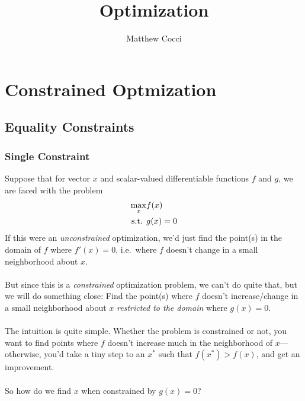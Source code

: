 \documentclass[a4paper,12pt]{scrartcl}
\author{Matthew Cocci}
\title{Optimization}
\date{}
\theoremstyle{definition}
\theoremstyle{remark}
\begin{document}
\maketitle

\tableofcontents %

\clearpage
\section{Constrained Optmization}

\subsection{Equality Constraints}

\subsubsection{Single Constraint}
Suppose that for vector $x$ and scalar-valued differentiable functions
$f$ and $g$, we are faced with the problem
\begin{align}
  \max_x &f(x) \label{prob:eqconst}\\
  \text{s.t. } &g(x) = 0 \notag
\end{align}
If this were an \emph{unconstrained} optimization, we'd just find the
point(s) in the domain of $f$ where $f'(x)=0$, i.e.\ where $f$ doesn't
change in a small neighborhood about $x$.
\\
\\
But since this is a \emph{constrained} optimization problem, we can't do
quite that, but we will do something close: Find the point(s) where $f$
doesn't increase/change in a small neighborhood about $x$
\emph{restricted to the domain} where $g(x)=0$.
\\
\\
The intuition is quite simple. Whether the problem is constrained or
not, you want to find points where $f$ doesn't increase much in the
neighborhood of $x$---otherwise, you'd take a tiny step to an $x^*$ such
that $f(x^*) > f(x)$, and get an improvement.
\\
\\
So how do we find $x$ when constrained by $g(x)=0$?
\end{document}
